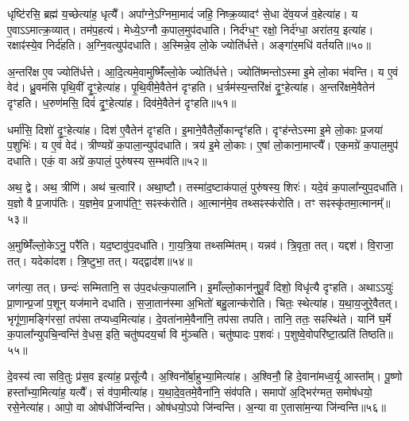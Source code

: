 धृष्टि॑रसि॒ ब्रह्म॑ य॒च्छेत्या॑ह॒ धृत्यै᳚।
अपा᳚ग्ने॒\-ऽग्निमा॒मादं॑ जहि॒ निष्क्र॒व्यादꣳ॑ से॒धा दे॑व॒यजं॑ व॒हेत्या॑ह।
य ए॒वाऽऽमात्क्र॒व्यात्।
तम॑प॒हत्य॑।
मेध्ये॒\-ऽग्नौ क॒पाल॒मुप॑दधाति।
निर्द॑ग्ध॒ꣳ॒ रक्षो॒ निर्द॑ग्धा॒ अरा॑तय॒ इत्या॑ह।
रक्षाꣴ॑स्ये॒व निर्द॑हति।
अ॒ग्नि॒वत्युप॑दधाति।
अ॒स्मिन्ने॒व लो॒के ज्योति॑र्धत्ते।
अङ्गा॑र॒मधि॑ वर्तयति॥५०॥\ip

अ॒न्तरि॑क्ष ए॒व ज्योति॑र्धत्ते।
आ॒दि॒त्यमे॒वामुष्मिँ॑ल्लो॒के ज्योति॑र्धत्ते।
ज्योति॑ष्मन्तो\-ऽस्मा इ॒मे लो॒का भ॑वन्ति।
य ए॒वं वेद॑।
ध्रु॒वम॑सि पृथि॒वीं दृ॒ꣳ॒हेत्या॑ह।
पृ॒थि॒वीमे॒वैतेन॑ दृꣳहति।
ध॒र्त्रम॑स्य॒न्तरि॑क्षं दृ॒ꣳ॒हेत्या॑ह।
अ॒न्तरि॑क्षमे॒वैतेन॑ दृꣳहति।
ध॒रुण॑मसि॒ दिवं॑ दृ॒ꣳ॒हेत्या॑ह।
दिव॑मे॒वैतेन॑ दृꣳहति॥५१॥\ip

धर्मा॑सि॒ दिशो॑ दृ॒ꣳ॒हेत्या॑ह।
दिश॑ ए॒वैतेन॑ दृꣳहति।
इ॒माने॒वैतैर्लो॒कान्दृꣳ॑हति।
दृꣳह॑न्ते\-ऽस्मा इ॒मे लो॒काः प्र॒जया॑ प॒शुभिः॑।
य ए॒वं वेद॑।
त्रीण्यग्रे॑ क॒पाला॒न्युप॑दधाति।
त्रय॑ इ॒मे लो॒काः।
ए॒षां लो॒काना॒माप्त्यै᳚।
एक॒मग्रे॑ क॒पाल॒मुप॑ दधाति।
एकं॒ वा अग्रे॑ क॒पालं॒ पुरु॑षस्य स॒म्भव॑ति॥५२॥\ip

अथ॒ द्वे।
अथ॒ त्रीणि॑।
अथ॑ च॒त्वारि॑।
अथा॒ष्टौ।
तस्मा॑द॒ष्टा\-क॑पालं॒ पुरु॑षस्य॒ शिरः॑।
यदे॒वं क॒पाला᳚न्युप॒दधा॑ति।
य॒ज्ञो वै प्र॒जा\-प॑तिः।
य॒ज्ञमे॒व प्र॒जा\-प॑ति॒ꣳ॒ सꣴस्क॑रोति।
आ॒त्मान॑मे॒व तथ्सꣴस्क॑रोति।
तꣳ सꣴस्कृ॑तमा॒त्मानम्᳚॥५३॥\ip

अ॒मुष्मिँ॑ल्लो॒केऽनु॒ परै॑ति।
यद॒ष्टावु॑प॒दधा॑ति।
गा॒य॒त्रि॒या तथ्सम्मि॑तम्।
यन्नव॑।
त्रि॒वृता॒ तत्।
यद्दश॑।
वि॒राजा॒ तत्।
यदेका॑दश।
त्रि॒ष्टुभा॒ तत्।
यद्द्वाद॑श॥५४॥\ip

जग॑त्या॒ तत्।
छन्दः॑ सम्मितानि॒ स उ॑प॒दध॑त्क॒पाला॑नि।
इ॒माँल्लो॒कान॑नुपू॒र्वं दिशो॒ विधृ॑त्यै दृꣳहति।
अथाऽऽयुः॑ प्रा॒णान्प्र॒जां प॒शून् यज॑माने दधाति।
स॒जा॒तान॑स्मा अ॒भितो॑ बहु॒लान्क॑रोति।
चितः॒ स्थेत्या॑ह।
य॒था॒\-य॒जु\-रे॒वै\-तत्।
भृगू॑णा॒मङ्गि॑रसां॒ तप॑सा तप्यध्व॒मित्या॑ह।
दे॒वता॑नामे॒वैना॑नि॒ तप॑सा तपति।
तानि॒ ततः॒ सꣴस्थि॑ते।
यानि॑ घ॒र्मे क॒पाला᳚न्युपचि॒न्वन्ति॑ वे॒धस॒ इति॒ चतु॑ष्पदय॒र्चा वि मु॑ञ्चति।
चतु॑ष्पादः प॒शवः॑।
प॒शुष्वे॒वोपरि॑ष्टा॒त्प्रति॑ तिष्ठति॥५५॥\ip{}

दे॒वस्य॑ त्वा सवि॒तुः प्र॑स॒व इत्या॑ह॒ प्रसू᳚त्यै।
अ॒श्विनो᳚र्बा॒हुभ्या॒मि\-त्या॑ह।
अ॒श्विनौ॒ हि दे॒वाना॑मध्व॒र्यू आस्ता᳚म्।
पू॒ष्णो हस्ता᳚भ्या॒मित्या॑ह॒ यत्यै᳚।
सं व॑पा॒मीत्या॑ह।
य॒था॒दे॒व॒तमे॒वैना॑नि॒ संव॑पति।
समापो॑ अ॒द्भिर॑ग्मत॒ समोष॑धयो॒ रसे॒नेत्या॑ह।
आपो॒ वा ओष॑धीर्जिन्वन्ति।
ओष॑धयो॒ऽपो जि॑न्वन्ति।
अ॒न्या वा ए॒तासा॑म॒न्या जि॑न्वन्ति॥५६॥\ip

